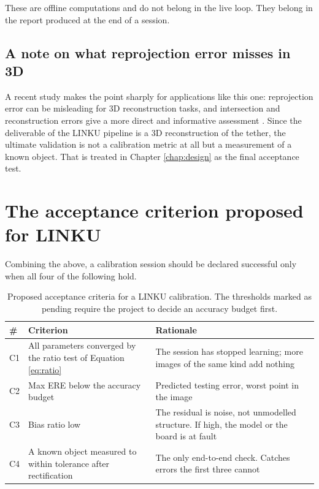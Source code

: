 These are offline computations and do not belong in the live loop. They belong in the report produced at the end of a session.

\subsection{A note on what reprojection error misses in 3D}

A recent study makes the point sharply for applications like this one: reprojection error can be misleading for 3D reconstruction tasks, and intersection and reconstruction errors give a more direct and informative assessment \cite{ruppel2026beyond}. Since the deliverable of the LINKU pipeline is a 3D reconstruction of the tether, the ultimate validation is not a calibration metric at all but a measurement of a known object. That is treated in Chapter \ref{chap:design} as the final acceptance test.

\section{The acceptance criterion proposed for LINKU}

Combining the above, a calibration session should be declared successful only when all four of the following hold.

\begin{table}[!ht]
\centering
\small
\caption[Proposed acceptance criteria]{Proposed acceptance criteria for a LINKU calibration. The thresholds marked as pending require the project to decide an accuracy budget first.}
\label{tab:acceptance}
\begin{tabularx}{\textwidth}{p{} p{} X}
\toprule
\textbf{\#} & \textbf{Criterion} & \textbf{Rationale} \\
\midrule
C1 & All parameters converged by the ratio test of Equation \ref{eq:ratio} & The session has stopped learning; more images of the same kind add nothing \cite{rojtberg2018pose} \\
C2 & Max ERE below the accuracy budget & Predicted testing error, worst point in the image \cite{richardson2013aprilcal} \\
C3 & Bias ratio low & The residual is noise, not unmodelled structure. If high, the model or the board is at fault \cite{hagemann2021bias} \\
C4 & A known object measured to within tolerance after rectification & The only end-to-end check. Catches errors the first three cannot \cite{ruppel2026beyond} \\
\bottomrule
\end{tabularx}
\end{table}

